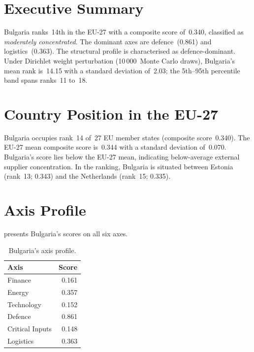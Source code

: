 \documentclass[12pt,a4paper]{article}
\begin{document}
\hypersetup{pageanchor=true}
\pagestyle{fancy}
\renewcommand{\headrulewidth}{0.4pt}


\section{Executive Summary}
\label{sec:summary}

Bulgaria ranks~14th in the EU-27 with a composite \ISI score of~0.340, classified as \emph{moderately concentrated}.  The dominant axes are defence~(0.861) and logistics~(0.363).  The structural profile is characterised as defence-dominant.  Under Dirichlet weight perturbation (10\,000~Monte Carlo draws), Bulgaria's mean rank is~14.15 with a standard deviation of~2.03; the 5th--95th percentile band spans ranks~11 to~18.


\section{Country Position in the EU-27}
\label{sec:position}

Bulgaria occupies rank~14 of~27 EU member states (composite score~0.340).  The EU-27 mean composite score is~0.344 with a standard deviation of~0.070.  Bulgaria's score lies below the EU-27 mean, indicating below-average external supplier concentration.  In the ranking, Bulgaria is situated between Estonia (rank~13; 0.343) and the Netherlands (rank~15; 0.335).


\section{Axis Profile}
\label{sec:axis-profile}

 presents Bulgaria's scores on all six \ISI axes.

\begin{table}[htbp]
\centering\small
\caption{Bulgaria's \ISI axis profile.}
\label{tab:axis-profile}
\begin{tabular}{@{}lr@{}}
\toprule
\textbf{Axis} & \textbf{Score} \\
\midrule
    Finance           & 0.161 \\
    Energy            & 0.357 \\
    Technology        & 0.152 \\
    Defence           & 0.861 \\
    Critical Inputs   & 0.148 \\
    Logistics         & 0.363 \\
\bottomrule
\end{tabular}
\end{table}
\end{document}
